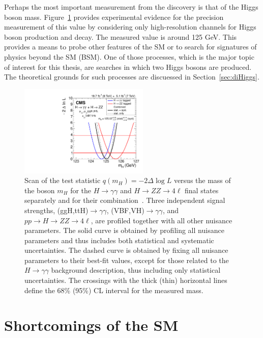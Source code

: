 Perhaps the most important measurement from the discovery is that of the Higgs boson mass.
Figure~\ref{fig:measuredmass} provides experimental evidence for the precision measurement of this
value by considering only high-resolution channels for Higgs boson production and decay.
The measured value is around 125 GeV. This provides a means to probe other features of the SM
or to search for signatures of physics beyond the SM (BSM). One of those processes, which
is the major topic of interest for this thesis, are searches in which two Higgs bosons are produced.
The theoretical grounds for such processes are discuessed in
Section~\ref{sec:diHiggs}.


\begin{figure}[ht]
 \begin{center}
    \includegraphics[width=0.55\textwidth]{figures/intro/sqr_mass_all.pdf}
      \end{center}
\caption{Scan of the test statistic $q(m_H)=−2\Delta\log{L}$ versus the mass of the boson $m_H$ for the $H\rightarrow\gamma\gamma$ and $H\rightarrow ZZ\rightarrow 4\ell$ final states separately and for their combination~\cite{Khachatryan:1979247}. Three independent signal strengths, (ggH,ttH)$\rightarrow\gamma\gamma$, (VBF,VH)$\rightarrow\gamma\gamma$, and $pp\rightarrow H\rightarrow ZZ\rightarrow 4\ell$, are profiled together with all other nuisance parameters. The solid curve is obtained by profiling all nuisance parameters and thus includes both statistical and systematic uncertainties. The dashed curve is obtained by fixing all nuisance parameters to their best-fit values, except for those related to the $H\rightarrow\gamma\gamma$ background description, thus including only statistical uncertainties. The crossings with the thick (thin) horizontal lines define the 68\% (95\%) CL interval for the measured mass. }
\label{fig:measuredmass}
\end{figure}



\section{Shortcomings of the SM\label{sec:SMshortcomings}}

